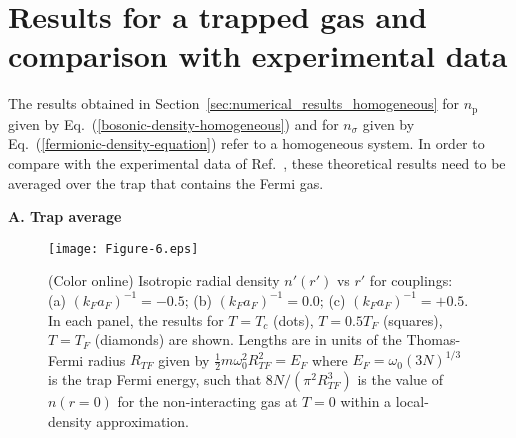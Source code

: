 \documentclass[pra,twocolumn,aps,amssymb,showpacs,superscriptaddress]{revtex4-1}
\begin{document}
\section{Results for a trapped gas and comparison with experimental data} 
\label{sec:comparison_with_experiment}

The results obtained in Section~\ref{sec:numerical_results_homogeneous} for $n_{\mathrm{p}}$ given by Eq.~(\ref{bosonic-density-homogeneous}) 
and for $n_{\sigma}$ given by Eq.~(\ref{fermionic-density-equation}) refer to a homogeneous system.
In order to compare with the experimental data of Ref.~\cite{Ulm-Cam-2019}, these theoretical results need to be averaged over the trap that contains the Fermi gas.

\vspace{0.05cm}
\begin{center}
{\bf A. Trap average}
\end{center}

\begin{figure}[t]
\begin{center}
\texttt{[image: Figure-6.eps]}
\caption{(Color online) Isotropic radial density $n'(r')$ vs $r'$ for couplings: (a) $(k_{F} a_{F})^{-1} = -0.5$; (b) $(k_{F} a_{F})^{-1} = 0.0$; (c) $(k_{F} a_{F})^{-1} = +0.5$. 
                                    In each panel, the results for $T=T_{c}$ (dots), $T=0.5T_{F}$ (squares), $T=T_{F}$ (diamonds) are shown.
                                    Lengths are in units of the Thomas-Fermi radius $R_{TF}$ given by $\frac{1}{2} m \omega_{0}^{2} R_{TF}^{2} = E_{F}$
                                    where $E_{F} = \omega_{0} (3N)^{1/3}$ is the trap Fermi energy, such that  $8N/(\pi^2 R_{TF}^3)$ is the value of $n(r=0)$ for the non-interacting 
                                    gas at $T=0$ within a local-density approximation.}
\label{Figure-6}
\end{center}
\end{figure} 
\end{document}
